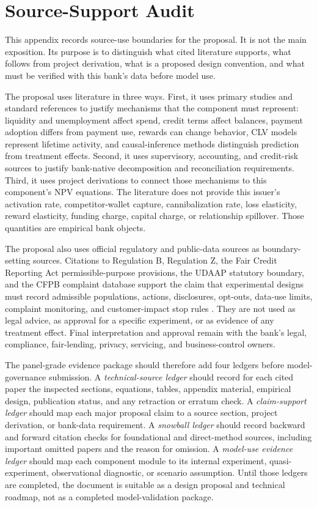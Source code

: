 \documentclass[11pt]{article}
\newcommand{\1}{\mathbf{1}}
\begin{document}
\section{Source-Support Audit}
\label{sec:audit}

This appendix records source-use boundaries for the proposal. It is not the
main exposition. Its purpose is to distinguish what cited literature supports,
what follows from project derivation, what is a proposed design convention, and
what must be verified with this bank's data before model use.

The proposal uses literature in three ways. First, it uses primary studies and
standard references to justify mechanisms that the component must represent:
liquidity and unemployment affect spend, credit terms affect balances, payment
adoption differs from payment use, rewards can change behavior, CLV models
represent lifetime activity, and causal-inference methods distinguish
prediction from treatment effects. Second, it uses supervisory, accounting,
and credit-risk sources to justify bank-native decomposition and reconciliation
requirements. Third, it uses project derivations to connect those mechanisms
to this component's NPV equations. The literature does not provide this
issuer's activation rate, competitor-wallet capture, cannibalization rate,
loss elasticity, reward elasticity, funding charge, capital charge, or
relationship spillover. Those quantities are empirical bank objects.

The proposal also uses official regulatory and public-data sources as
boundary-setting sources. Citations to Regulation B, Regulation Z, the Fair
Credit Reporting Act permissible-purpose provisions, the UDAAP statutory
boundary, and the CFPB complaint database support the claim that experimental
designs must record admissible populations, actions, disclosures, opt-outs,
data-use limits, complaint monitoring, and customer-impact stop rules
\citep{cfpbRegB1002,cfpbRegZ1026,uscodeFCRA1681b,uscodeUDAAP5531,
cfpbConsumerComplaints}. They are not used as legal advice, as approval for a
specific experiment, or as evidence of any treatment effect. Final
interpretation and approval remain with the bank's legal, compliance,
fair-lending, privacy, servicing, and business-control owners.

The panel-grade evidence package should therefore add four ledgers before
model-governance submission. A \emph{technical-source ledger} should record
for each cited paper the inspected sections, equations, tables, appendix
material, empirical design, publication status, and any retraction or erratum
check. A \emph{claim-support ledger} should map each major proposal claim to a
source section, project derivation, or bank-data requirement. A
\emph{snowball ledger} should record backward and forward citation checks for
foundational and direct-method sources, including important omitted papers and
the reason for omission. A \emph{model-use evidence ledger} should map each
component module to its internal experiment, quasi-experiment, observational
diagnostic, or scenario assumption. Until those ledgers are completed, the
document is suitable as a design proposal and technical roadmap, not as a
completed model-validation package.
\end{document}

